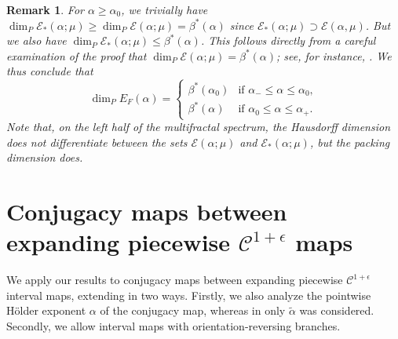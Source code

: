 \documentclass[11pt]{amsart}
\newcommand\EE{\mathscr{E}}
\newcommand{\1}{1}
\newtheorem{remark}[theorem]{Remark}
\begin{document}
\begin{remark}
{For $\alpha\geq\alpha_0$, we trivially have $\dim_P \EE_*(\alpha;\mu)\geq \dim_P\EE(\alpha;\mu)=\beta^*(\alpha)$ since $\EE_*(\alpha;\mu)\supset\EE(\alpha,\mu)$. But we also have $\dim_P \EE_*(\alpha;\mu)\leq \beta^*(\alpha)$. This follows directly from a careful examination of the proof that $\dim_P \EE(\alpha;\mu)=\beta^*(\alpha)$; see, for instance, \cite[p.~501]{Patzschke}. 
We thus conclude that
\begin{equation} \label{eq:packing-spectrum}
\dim_P E_F(\alpha)=\begin{cases}
\beta^*(\alpha_0) & \mbox{if $\alpha_-\leq\alpha\leq\alpha_0$},\\
\beta^*(\alpha) & \mbox{if $\alpha_0\leq\alpha\leq \alpha_+$}.
\end{cases}
\end{equation}
Note that, on the left half of the multifractal spectrum, the Hausdorff dimension does not differentiate between the sets $\EE(\alpha;\mu)$ and $\EE_*(\alpha;\mu)$, but the packing dimension does. %

}
\end{remark}


\section{Conjugacy maps between expanding piecewise $\mathcal{C}^{1+\epsilon}$ maps} \label{sec:conjugacy-maps}

We apply our results to conjugacy maps 
between expanding piecewise $\mathcal{C}^{1+\epsilon}$ interval maps, 
extending  \cite[Corollary 2.3]{JS-2020} in two ways. Firstly, we also analyze the pointwise  H\"older exponent $\alpha$ of the conjugacy map, whereas in   \cite{JS-2020} only $\tilde \alpha$ was considered. Secondly, we allow interval maps with orientation-reversing branches. 
\end{document}

